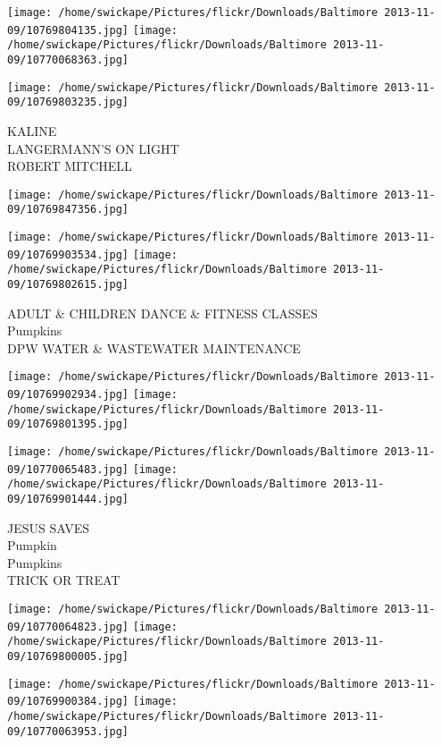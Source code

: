 \documentclass[10pt,letterpaper]{article}
\begin{document}
\texttt{[image: /home/swickape/Pictures/flickr/Downloads/Baltimore 2013-11-09/10769804135.jpg]}
\texttt{[image: /home/swickape/Pictures/flickr/Downloads/Baltimore 2013-11-09/10770068363.jpg]}

\texttt{[image: /home/swickape/Pictures/flickr/Downloads/Baltimore 2013-11-09/10769803235.jpg]}

KALINE\\
LANGERMANN'S ON LIGHT\\
ROBERT MITCHELL\\
\pagebreak

\texttt{[image: /home/swickape/Pictures/flickr/Downloads/Baltimore 2013-11-09/10769847356.jpg]}

\vspace{0.25in}
\texttt{[image: /home/swickape/Pictures/flickr/Downloads/Baltimore 2013-11-09/10769903534.jpg]}
\texttt{[image: /home/swickape/Pictures/flickr/Downloads/Baltimore 2013-11-09/10769802615.jpg]}

ADULT \& CHILDREN DANCE \& FITNESS CLASSES\\
Pumpkins\\
DPW WATER \& WASTEWATER MAINTENANCE\\
\pagebreak

\texttt{[image: /home/swickape/Pictures/flickr/Downloads/Baltimore 2013-11-09/10769902934.jpg]}
\texttt{[image: /home/swickape/Pictures/flickr/Downloads/Baltimore 2013-11-09/10769801395.jpg]}

\texttt{[image: /home/swickape/Pictures/flickr/Downloads/Baltimore 2013-11-09/10770065483.jpg]}
\texttt{[image: /home/swickape/Pictures/flickr/Downloads/Baltimore 2013-11-09/10769901444.jpg]}

JESUS SAVES\\
Pumpkin\\
Pumpkins\\
TRICK OR TREAT\\
\pagebreak

\texttt{[image: /home/swickape/Pictures/flickr/Downloads/Baltimore 2013-11-09/10770064823.jpg]}
\texttt{[image: /home/swickape/Pictures/flickr/Downloads/Baltimore 2013-11-09/10769800005.jpg]}

\texttt{[image: /home/swickape/Pictures/flickr/Downloads/Baltimore 2013-11-09/10769900384.jpg]}
\texttt{[image: /home/swickape/Pictures/flickr/Downloads/Baltimore 2013-11-09/10770063953.jpg]}
\end{document}
